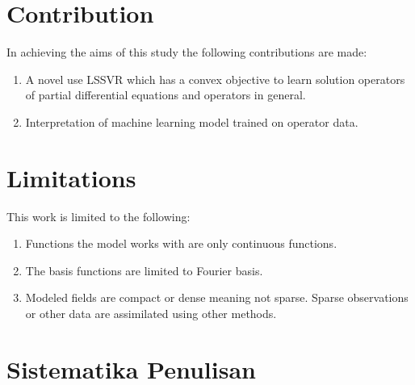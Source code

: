 \section{Contribution}
\noindent In achieving the aims of this study the following contributions are made:
\begin{enumerate}
    \item A novel use LSSVR which has a convex objective to learn solution operators of partial differential equations and operators in general.
    \item Interpretation of machine learning model trained on operator data.
\end{enumerate}

\section{Limitations}
\noindent This work is limited to the following:
\begin{enumerate}
    \item Functions the model works with are only continuous functions.
    \item The basis functions are limited to Fourier basis.
    \item Modeled fields are compact or dense meaning not sparse. Sparse observations or other data are assimilated using other methods.
\end{enumerate}

\section{Sistematika Penulisan}

